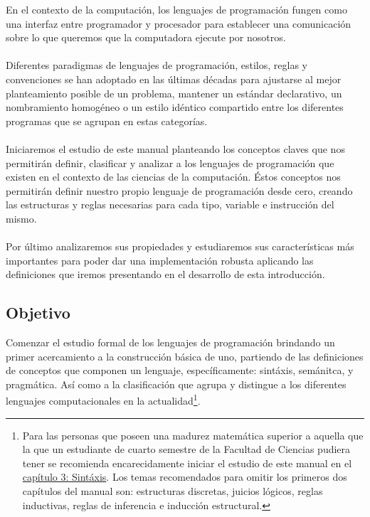 En el contexto de la computación, los lenguajes de programación fungen como una interfaz entre programador y procesador para establecer una comunicación sobre lo que queremos que la computadora ejecute por nosotros.\\\\
Diferentes paradigmas de lenguajes de programación, estilos, reglas y convenciones se han adoptado en las últimas décadas para ajustarse al mejor planteamiento posible de un problema, mantener un estándar declarativo, un nombramiento homogéneo o un estilo idéntico compartido entre los diferentes programas que se agrupan en estas categorías.\\\\
Iniciaremos el estudio de este manual planteando los conceptos claves que nos permitirán definir, clasificar y analizar a los lenguajes de programación que existen en el contexto de las ciencias de la computación. Éstos conceptos nos permitirán definir nuestro propio lenguaje de programación desde cero, creando las estructuras y reglas necesarias para cada tipo, variable e instrucción del mismo.\\\\
Por último analizaremos sus propiedades y estudiaremos sus características más importantes para poder dar una implementación robusta aplicando las definiciones que iremos presentando en el desarrollo de esta introducción.\\

\subsection*{Objetivo}
    Comenzar el estudio formal de los lenguajes de programación brindando un primer acercamiento a la construcción básica de uno, partiendo de las definiciones de conceptos que componen un lenguaje, específicamente: sintáxis, semánitca, y pragmática. Así como a la clasificación que agrupa y distingue a los diferentes lenguajes computacionales en la actualidad\footnote{Para las personas que poseen una madurez matemática superior a aquella que la que un estudiante de cuarto semestre de la Facultad de Ciencias pudiera tener se recomienda encarecidamente iniciar el estudio de este manual en el \hyperref[sec:sintax]{capítulo 3: Sintáxis}. Los temas recomendados para omitir los primeros dos capítulos del manual son: estructuras discretas, juicios lógicos, reglas inductivas, reglas de inferencia e inducción estructural. }.

